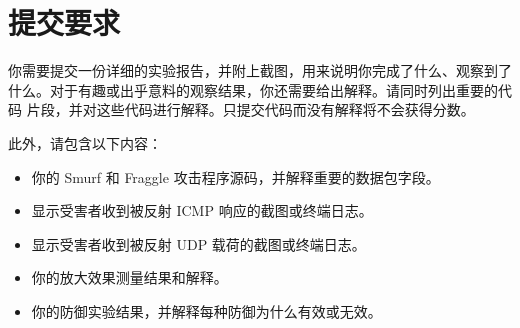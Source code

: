 \section{提交要求}

你需要提交一份详细的实验报告，并附上截图，用来说明你完成了什么、观察到了
什么。对于有趣或出乎意料的观察结果，你还需要给出解释。请同时列出重要的代码
片段，并对这些代码进行解释。只提交代码而没有解释将不会获得分数。

此外，请包含以下内容：

\begin{itemize}[noitemsep]
\item 你的 Smurf 和 Fraggle 攻击程序源码，并解释重要的数据包字段。
\item 显示受害者收到被反射 ICMP 响应的截图或终端日志。
\item 显示受害者收到被反射 UDP 载荷的截图或终端日志。
\item 你的放大效果测量结果和解释。
\item 你的防御实验结果，并解释每种防御为什么有效或无效。
\end{itemize}


